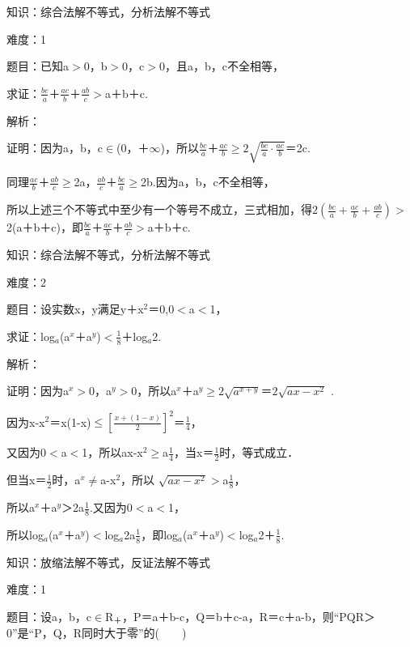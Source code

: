 \documentclass{article} %
\begin{document}
 知识：综合法解不等式，分析法解不等式

 难度：1

 题目：已知a$\mathrm{>}$0，b$\mathrm{>}$0，c$\mathrm{>}$0，且a，b，c不全相等，

 求证：$\frac{bc}{a}$＋$\frac{ac}{b}$＋$\frac{ab}{c}$$\mathrm{>}$a＋b＋c.

 解析：

 证明：因为a，b，c$\mathrm{\in}$(0，＋$\mathrm{\infty}$)，所以$\frac{bc}{a}$＋$\frac{ac}{b}$$\mathrm{\ge}$$2\sqrt{\frac{bc}{a}\cdot\frac{ac}{b}}$＝2c.

同理$\frac{ac}{b}$＋$\frac{ab}{c}$$\mathrm{\ge}$2a，$\frac{ab}{c}$＋$\frac{bc}{a}$$\mathrm{\ge}$2b.因为a，b，c不全相等，

所以上述三个不等式中至少有一个等号不成立，三式相加，得$2(\frac{bc}{a}+\frac{ac}{b}+\frac{ab}{c})$$\mathrm{>}$2(a＋b＋c)，即$\frac{bc}{a}$＋$\frac{ac}{b}$＋$\frac{ab}{c}$$\mathrm{>}$a＋b＋c.



 知识：综合法解不等式，分析法解不等式

 难度：2

 题目：设实数x，y满足y＋x${}^{2}$＝0,0$\mathrm{<}$a$\mathrm{<}$1，

 求证：log${}_{a}$(a${}^{x}$＋a${}^{y}$)$\mathrm{<}$$\frac{1}{8}$＋log${}_{a}$2.

 解析：

 证明：因为a${}^{x}$$\mathrm{>}$0，a${}^{y}$$\mathrm{>}$0，所以a${}^{x}$＋a${}^{y}$$\mathrm{\ge}$$2\sqrt{a^{x+y}}$＝$2\sqrt{ax-x^2}$ .

因为x-x${}^{2}$＝x(1-x)$\mathrm{\le}$$[\frac{x+(1-x)}{2}]^2$＝$\frac{1}{4}$，

又因为0$\mathrm{<}$a$\mathrm{<}$1，所以ax-x${}^{2}$$\mathrm{\ge}$a$\frac{1}{4}$，当x＝$\frac{1}{2}$时，等式成立．

但当x＝$\frac{1}{2}$时，a${}^{x}$$\mathrm{\neq}$a-x${}^{2}$，所以 $\sqrt{ax-x^2}$$\mathrm{>}$a$\frac{1}{8}$，

所以a${}^{x}$＋a${}^{y}$＞2a$\frac{1}{8}$.又因为0$\mathrm{<}$a$\mathrm{<}$1，

所以log${}_{a}$(a${}^{x}$＋a${}^{y}$)$\mathrm{<}$log${}_{a}$2a$\frac{1}{8}$，即log${}_{a}$(a${}^{x}$＋a${}^{y}$)$\mathrm{<}$log${}_{a}$2＋$\frac{1}{8}$.




 

 知识：放缩法解不等式，反证法解不等式

 难度：1

 题目：设a，b，c$\mathrm{\in}$R${}_{\textrm{＋}}$，P＝a＋b-c，Q＝b＋c-a，R＝c＋a-b，则``PQR＞0''是``P，Q，R同时大于零''的(　　)
\end{document}
